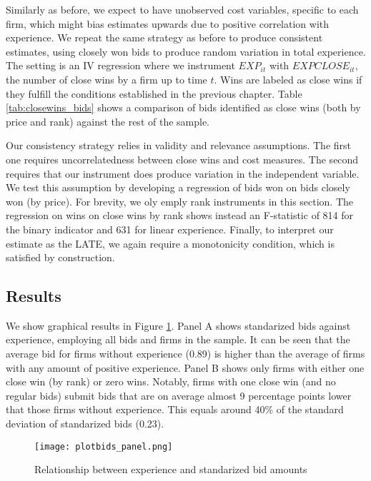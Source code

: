 Similarly as before, we expect to have unobserved cost variables, specific to each firm, which might bias estimates upwards due to positive correlation with experience. We repeat the same strategy as before to produce consistent estimates, using closely won bids to produce random variation in total experience. The setting is an IV regression where we instrument $EXP_{it}$ with $EXPCLOSE_{it}$, the number of close wins by a firm up to time $t$. Wins are labeled as close wins if they fulfill the conditions established in the  previous chapter. Table \ref{tab:closewins_bids} shows a comparison of bids identified as close wins (both by price and rank) against the rest of the sample.

Our consistency strategy relies in validity and relevance assumptions. The first one requires uncorrelatedness between close wins and cost measures. The second requires that our instrument does produce variation in the independent variable. We test this assumption by developing a regression of bids won on bids closely won (by price). For brevity, we oly emply rank instruments in this section. The regression on wins on close wins by rank shows instead an F-statistic of 814 for the binary indicator and 631 for linear experience. Finally, to interpret our estimate as the LATE, we again require a monotonicity condition, which is satisfied by construction.%

\subsection{Results}
We show graphical results in Figure \ref{fig:plotbids_panel}. Panel A shows standarized bids against experience, employing all bids and firms in the sample. It can be seen that the average bid for firms without experience (0.89) is higher than the average of firms with any amount of positive experience. Panel B shows only firms with either one close win (by rank) or zero wins. Notably, firms with one close win (and no regular bids) submit bids that are on average almost 9 percentage points lower that those firms without experience. This equals around 40\%  of the standard deviation of standarized bids (0.23).

\begin{figure}[H]
  \texttt{[image: plotbids\_panel.png]}
  \caption{Relationship between experience and standarized bid amounts}
  \label{fig:plotbids_panel}
\end{figure}

